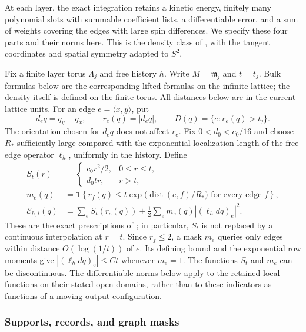 At each layer, the exact integration retains a kinetic energy, finitely
many polynomial slots with summable coefficient lists, a differentiable
error, and a sum of
weights covering the edges with large spin differences.  We specify
these four parts and their norms here.  This is the density class of
, with the tangent coordinates and spatial symmetry
adapted to $S^2$.

Fix a finite layer torus $\Lambda_j$ and free history $h$.
Write $M=\mathfrak m_j$ and $t=t_j$.  Bulk formulas below are the
corresponding lifted formulas on the infinite lattice; the density
itself is defined on the finite torus.  All distances below are in the
current lattice units.  For an
edge $e=\langle x,y\rangle$, put
\[
 d_eq=q_y-q_x,\qquad r_e(q)=|d_eq|,
 \qquad D(q)=\{e:r_e(q)>t_j\}.
\]
The orientation chosen for $d_eq$ does not affect $r_e$.
Fix $0<d_0<c_0/16$ and choose $R_*$ sufficiently large compared with the
exponential localization length of the free edge operator $\ell_h$,
uniformly in the history.  Define
\begin{align}
 S_t(r)&=
 \begin{cases}
  c_0r^2/2,&0\le r\le t,\\
  d_0tr,&r>t,
 \end{cases}
 \label{eq:setup-clipped-energy}\\
 m_e(q)&=\mathbf 1\!\left\{
    r_f(q)\le t\exp\bigl(\operatorname{dist}(e,f)/R_*\bigr)
                     \text{ for every edge }f\right\},
 \label{eq:setup-kinetic-mask}\\
 \mathcal E_{h,t}(q)&=
       \sum_e S_t(r_e(q))
       +\frac12\sum_e m_e(q)| (\ell_hdq)_e|^2.
 \label{eq:setup-effective-energy}
\end{align}
These are the exact prescriptions of ; in particular,
$S_t$ is not replaced by a continuous interpolation at $r=t$.
Since $r_f\le2$, a mask $m_e$ queries only edges within distance
$O(\log(1/t))$ of $e$.  Its defining bound and the exponential row
moments give $| (\ell_hdq)_e|\le Ct$ whenever $m_e=1$.
The functions $S_t$ and $m_e$ can be
discontinuous.  The differentiable norms below apply to the retained
local functions on their stated open domains, rather than to these
indicators as functions of a moving output configuration.

\subsubsection{Supports, records, and graph masks}

